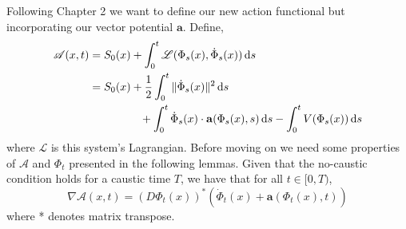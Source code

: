\documentclass[a4paper,12pt,draft]{report}
\begin{document}
Following Chapter 2 we want to define our new action functional but incorporating our vector potential $\mathbf{a}$.  Define,
\begin{align}
\mathscr{A}(x, t) & = S_0(x) + \int_0^t\mathscr{L}(\Phi_s(x), \dot{\Phi}_s(x))\,\mathrm{d}s\nonumber\\
& = S_0(x) + \frac{1}{2}\int_0^t\|\dot{\Phi}_s(x)\|^2\,\mathrm{d}s\nonumber\\
& \hspace{1.6cm} + \int_0^t\dot{\Phi}_s(x)\cdot\mathbf{a}(\Phi_s(x), s)\,\mathrm{d}s - \int_0^tV(\Phi_s(x))\,\mathrm{d}s\nonumber
\end{align}
where $\mathscr{L}$ is this system's Lagrangian.  Before moving on we need some properties of $\mathscr{A}$ and $\Phi_t$ presented in the following lemmas.
\lemma
{
Given that the no-caustic condition holds for a caustic time $T$, we have that for all $t \in [0, T)$,
$$
\nabla\mathscr{A}(x, t) = (D\Phi_t(x))^*(\dot{\Phi}_t(x) + \mathbf{a}(\Phi_t(x), t))
$$
where * denotes matrix transpose.
}
\proof
\end{document}
